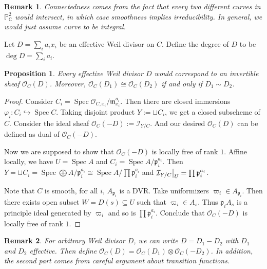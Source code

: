 \documentclass{ctexart}
\newtheorem{remark}{Remark}[section]
\newtheorem{proposition}{Proposition}[section]
\newcommand{\spec}{\operatorname{Spec}}
\begin{document}
\begin{remark}
    Connectedness comes from the fact that every two different curves in $\mathbb{P}_{\mathbb{C}}^{2}$ would intersect,
    in which case smoothness implies irreducibility.
    In general, we would just assume curve to be integral.
\end{remark}
Let $D = \sum_{i} a_{i}x_{i}$ be an effective Weil divisor on $C$.
Define the degree of $D$ to be $\deg D = \sum_{i} a_{i}$.
\begin{proposition}
    Every effective Weil divisor $D$ would correspond to an invertible sheaf $\mathcal{O}_{C}(D)$.
    Moreover, $\mathcal{O}_{C}(D_{1}) \cong \mathcal{O}_{C}(D_{2})$ if and only if $D_{1} \sim D_{2}$.
    \label{Proposition 3.3}
\end{proposition} 
\begin{proof}
    Consider $C_{i} = \spec \mathcal{O}_{C, x_{i}}/\mathfrak{m}_{x_{i}}^{a_{i}}$.
    Then there are closed immersions $\varphi_{i}: C_{i} \hookrightarrow \spec C$.
    Taking disjoint product $Y := \sqcup C_{i}$, we get a closed subscheme of $C$.
    Consider the ideal sheaf $\mathcal{O}_{C}(-D) := \mathcal{I}_{Y/C}$.
    And our desired $\mathcal{O}_{C}(D)$ can be defined as dual of $\mathcal{O}_{C}(-D)$.
    \par
    Now we are supposed to show that $\mathcal{O}_{C}(-D)$ is locally free of rank $1$.
    Affine locally, we have $U = \spec A$ and $C_{i} = \spec A/\mathfrak{p}_{i}^{a_{i}}$.
    Then $Y = \sqcup C_{i} = \spec \bigoplus A/\mathfrak{p}_{i}^{a_{i}} \cong \spec A/\prod \mathfrak{p}_{i}^{a_{i}}$ and $\mathcal{I}_{Y/C}\big{|}_{U} = \prod \mathfrak{p}_{i}^{a_{i}}$.
    \par
    Note that $C$ is smooth, for all $i$, $A_{\mathfrak{p}_{i}}$ is a DVR.
    Take uniformizers $\varpi_{i}\in A_{\mathfrak{p}_{i}}$.
    Then there exists open subset $W = D(s) \subseteq U$ such that $\varpi_{i}\in A_{s}$.
    Thus $\mathfrak{p}_{i}A_{s}$ is a principle ideal generated by $\varpi_{i}$ and so is $\prod \mathfrak{p}_{i}^{a_{i}}$.
    Conclude that $\mathcal{O}_{C}(-D)$ is locally free of rank $1$.
\end{proof}
\begin{remark}
    For arbitrary Weil divisor $D$, we can write $D = D_{1} - D_{2}$ with $D_{1}$ and $D_{2}$ effective.
    Then define $\mathcal{O}_{C}(D) = \mathcal{O}_{C}(D_{1}) \otimes \mathcal{O}_{C}(-D_{2})$.
    In addition, the second part comes from careful argument about transition functions.
\end{remark}
\end{document}
